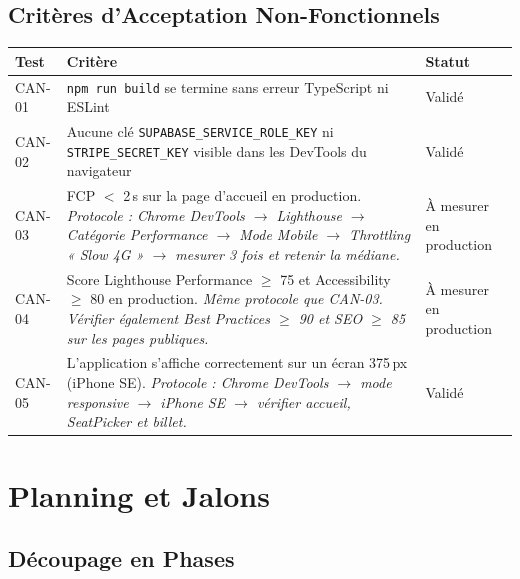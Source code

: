 \documentclass[12pt,a4paper,openany]{report}
\begin{document}
\section{Critères d'Acceptation Non-Fonctionnels}

\begin{longtable}{p{1.2cm}p{7.2cm}p{3.0cm}}
  \toprule
  \textbf{Test} & \textbf{Critère} & \textbf{Statut} \\
  \midrule
  \endhead
  \bottomrule
  \endfoot

  CAN-01 & \texttt{npm run build} se termine sans erreur TypeScript ni ESLint & Validé \\[4pt]

  CAN-02 & Aucune clé \texttt{SUPABASE\_SERVICE\_ROLE\_KEY} ni \texttt{STRIPE\_SECRET\_KEY} visible dans les DevTools du navigateur & Validé \\[4pt]

  CAN-03 & FCP $<$ 2\,s sur la page d'accueil en production. \textit{Protocole : Chrome DevTools $\to$ Lighthouse $\to$ Catégorie Performance $\to$ Mode Mobile $\to$ Throttling « Slow 4G » $\to$ mesurer 3 fois et retenir la médiane.} & À mesurer en production \\[4pt]

  CAN-04 & Score Lighthouse Performance $\geq$ 75 et Accessibility $\geq$ 80 en production. \textit{Même protocole que CAN-03. Vérifier également Best Practices $\geq$ 90 et SEO $\geq$ 85 sur les pages publiques.} & À mesurer en production \\[4pt]

  CAN-05 & L'application s'affiche correctement sur un écran 375\,px (iPhone SE). \textit{Protocole : Chrome DevTools $\to$ mode responsive $\to$ iPhone SE $\to$ vérifier accueil, SeatPicker et billet.} & Validé \\
\end{longtable}

\chapter{Planning et Jalons}

\section{Découpage en Phases}
\end{document}
